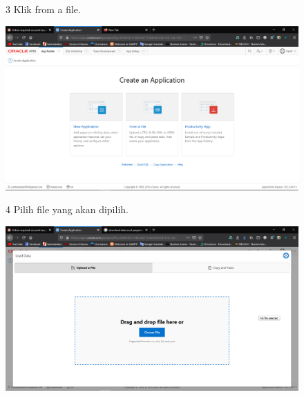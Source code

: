 \begin{enumerate}
\begin{figure}[!htbp]    
\item[3] Klik from a file.
\begin{center}
    \includegraphics[scale=0.3]{section/Screenshot(30).png}
    \end{center}
    \end{figure}

\begin{figure}[!htbp]
\item[4] Pilih file yang akan dipilih.
\begin{center}
    \includegraphics[scale=0.3]{section/Screenshot(31).png}
    \end{center}
    \end{figure}


\end{enumerate}
